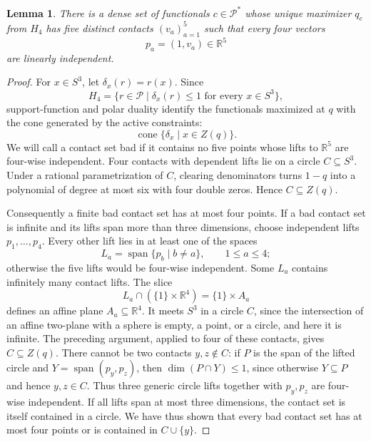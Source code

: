 \documentclass[11pt,onecolumn]{article}
\theoremstyle{blueplain}
\newtheorem{lemma}[lemma]{Lemma}
\theoremstyle{bluedefinition}
\theoremstyle{bluedefinition}
\newcommand{\R}{\mathbb R}
\begin{document}
\begin{lemma}\label{lem:generic-contacts}
There is a dense set of functionals 
\(c\in\mathcal P^*\) whose unique maximizer \(q_c\) from $H_4$ has five distinct
contacts \((v_a)_{a=1}^5\) such that every four vectors
\[
 p_a=(1,v_a)\in\mathbb R^5
\]
are linearly independent.
\end{lemma}

\begin{proof}
For \(x\in S^3\), let \(\delta_x(r)=r(x)\).  Since
\[
 H_4=\{r\in\mathcal P\mid \delta_x(r)\leqslant1
                         \text{ for every }x\in S^3\},
\]
support-function and polar duality
\cite{Rockafellar} identify the functionals maximized
at \(q\) with the cone generated by the active constraints:
\[
 \operatorname{cone}\{\delta_x\mid x\in Z(q)\}.
\]
We will call a contact set bad if it contains no five points whose lifts to $\R^5$ are
four-wise independent.  Four contacts with dependent lifts lie on a circle
\(C\subseteq S^3\).  Under a rational parametrization of \(C\), clearing
denominators turns \(1-q\) into a polynomial of degree at most six with four
double zeros.  Hence \(C\subseteq Z(q)\).

Consequently a finite bad contact set has at most four points.  If a bad
contact set is infinite and its lifts span more than three dimensions,
choose independent lifts \(p_1,\ldots,p_4\).  Every other lift lies in at
least one of the spaces
\[
 L_a=\operatorname{span}\{p_b\mid b\ne a\},\qquad 1\leqslant a\leqslant4;
\]
otherwise the five lifts would be four-wise independent.  Some \(L_a\)
contains infinitely many contact lifts.  The slice
\[
 L_a\cap(\{1\}\times\mathbb R^4)=\{1\}\times A_a
\]
defines an affine plane \(A_a\subseteq\mathbb R^4\).  It meets \(S^3\) in a
circle \(C\), since the intersection of an affine two-plane with a sphere is
empty, a point, or a circle, and here it is infinite.  The preceding argument,
applied to four of these contacts, gives \(C\subseteq Z(q)\).  There
cannot be two contacts \(y,z\notin C\): if \(P\) is the span of the lifted
circle and \(Y=\operatorname{span}(p_y,p_z)\), then
\(\dim(P\cap Y)\leqslant1\), since otherwise \(Y\subseteq P\) and hence
\(y,z\in C\).  Thus three generic circle lifts together with
\(p_y,p_z\) are four-wise independent.  If all lifts span at most three
dimensions, the contact set is itself contained in a circle. 
We have thus shown that every
bad contact set has at most four points or is contained in
\(C\cup\{y\}\).


\end{proof}
\end{document}
